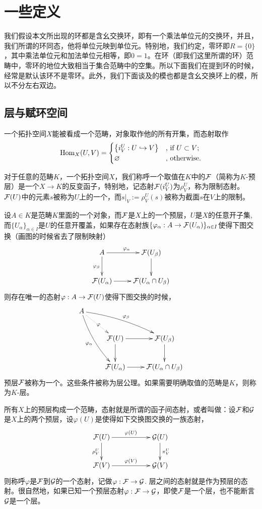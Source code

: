 \renewcommand\chapterimg{../../Pictures/7.png}
\chapter{一些定义}

我们假设本文所出现的环都是含幺交换环，即有一个乘法单位元的交换环，并且，我们所谓的环同态，他将单位元映到单位元。特别地，我们约定，零环即$R=\{0\}$，其中乘法单位元和加法单位元相等，即$0=1$。在环（即我们这里所谓的环）范畴中，零环的地位大致相当于集合范畴中的空集。所以下面我们在提到环的时候，经常是默认该环不是零环。此外，我们下面谈及的模也都是含幺交换环上的模，所以不分左右双边。

\section{层与赋环空间}

\para 一个拓扑空间$X$能被看成一个范畴，对象取作他的所有开集，而态射取作
\[
	\operatorname{Hom}_{X}(U,V)=\begin{cases}
	\bigl\{i^U_V:U\hookrightarrow V\bigr\}&\text{, if }U\subset V\text{;}\\
	\varnothing&\text{, otherwise}.
	\end{cases}
\]

\para 对于任意的范畴$K$，一个拓扑空间$X$，我们称呼一个取值在$K$中的$\mathcal{F}$（简称为$K$-预层）是一个$X\to K$的反变函子，特别地，记态射$\mathcal{F}(i^U_V)$为$\rho^U_V$，称为限制态射。 $\mathcal{F}(U)$中的元素$s$被称为$U$上的一个，而$s|_V:=\rho^U_V(s)$被称为截面$s$在$V$上的限制。

\para 设$A\in K$是范畴$K$里面的一个对象，而$\mathcal{F}$是$X$上的一个预层，$U$是$X$的任意开子集, 而$\{U_\alpha\}_{\alpha\in I}$是$U$的任意开覆盖，如果存在态射族$\{\varphi_\alpha:A\to \mathcal{F}(U_\alpha)\}_{\alpha\in I}$使得下图交换（画图的时候省去了限制映射）
\[
	\xymatrix{
		A\ar[r]^{\varphi_{\alpha}}\ar[d]_{\varphi_{\beta}}&\calf(U_\beta)\ar[d]\\
		\calf(U_\alpha)\ar[r]&\calf(U_{\alpha}\cap U_{\beta})
	}
\]
则存在唯一的态射$\varphi:A\to \mathcal{F}(U)$使得下图交换的时候，
\[
	\xymatrix{
		A\ar@/_/[ddr]_{\varphi_{\alpha}}\ar@/^/[drr]^{\varphi_{\beta}}\ar@{.>}[dr]|{\varphi}&& \\
		&\calf(U)\ar[r]\ar[d]&\calf(U_\beta)\ar[d]\\
		&\calf(U_\alpha)\ar[r]&\calf(U_{\alpha}\cap U_{\beta})
	}
\]
预层$\mathcal{F}$被称为一个。这些条件被称为层公理。如果需要明确取值的范畴是$K$，则称为$K$-层。

\para 所有$X$上的预层构成一个范畴，态射就是所谓的函子间态射，或者叫做：设$\mathcal{F}$和$\mathcal{G}$是$X$上的两个预层，设$\varphi(U)$是使得如下交换图交换的一族态射，
\[
	\xymatrix{
		\calf(U)\ar[rr]^{\varphi(U)} \ar[d]_{\rho^U_V}&&\calg(U) \ar[d]^{\pi^U_V}\\
		\calf(V)\ar[rr]^{\varphi(V)}&&\calg(V)
	}
\]
则称呼$\varphi$是$\mathcal{F}$到$\mathcal{G}$的一个态射，记做$\varphi:\mathcal{F}\to\mathcal{G}$. 层之间的态射就是作为预层的态射。很自然地，如果已知一个预层态射$\varphi:\mathcal{F}\to\mathcal{G}$，即使$\mathcal{F}$是一个层，也不能断言$\mathcal{G}$是一个层。

